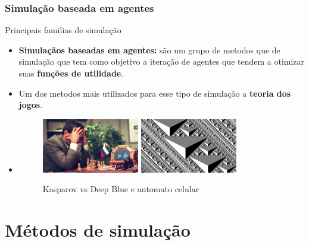 \documentclass{beamer}
\begin{document}
	\subsubsection{Simulação baseada em agentes}
	\begin{frame}{Principais familias de simulação}
		\begin{itemize}[<+->]
			\item \textbf{Simulaçãos baseadas em agentes:} são um grupo de metodos que de simulação que tem como objetivo a iteração de agentes que tendem a otimizar suas \textbf{funções de utilidade}.
			\item Um dos metodos mais utilizados para esse tipo de simulação a \textbf{teoria dos jogos}.
			\item 
			\begin{figure}[!v]
				\centering
				\includegraphics[width=0.4\textwidth]{kasparov}
				\includegraphics[width=0.4\textwidth]{CA}
				\caption{Kasparov vs Deep Blue e automato celular}
			\end{figure}
		\end{itemize}
	\end{frame}
	\section{Métodos de simulação}
\end{document}
